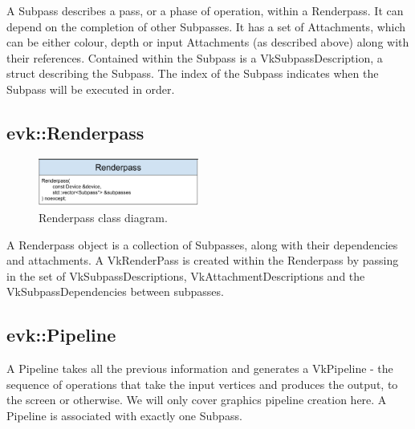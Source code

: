 \documentclass[12pt]{report}
\newcommand{\figurewidth}{0.55\textwidth}
\newcommand{\imagewidth}{0.47\textwidth}
\theoremstyle{definition}
\begin{document}
        A Subpass describes a pass, or a phase of operation, within a
        Renderpass. It can depend on the completion of other Subpasses.
        It has a set of Attachments, which can be either colour, depth or
        input Attachments (as described above) along with their references.
        Contained within the Subpass is a VkSubpassDescription, a struct
        describing the Subpass. The index of the Subpass indicates when the
        Subpass will be executed in order.

      \subsection{evk::Renderpass}

        \begin{figure}
          \centering
          \includegraphics[width=\imagewidth]{images/class_renderpass.png}
          \caption{Renderpass class diagram.}
          \label{fig:class_renderpass}
        \end{figure}

        A Renderpass object is a collection of Subpasses, along with their
        dependencies and attachments. A VkRenderPass is created within the
        Renderpass by passing in the set of VkSubpassDescriptions,
        VkAttachmentDescriptions and the VkSubpassDependencies between
        subpasses.

      \subsection{evk::Pipeline}

        A Pipeline takes all the previous information and generates a
        VkPipeline - the sequence of operations that take the input vertices
        and produces the output, to the screen or otherwise. We will only
        cover graphics pipeline creation here. A Pipeline is associated with
        exactly one Subpass.
        
\end{document}
